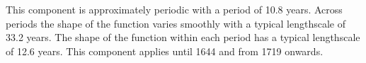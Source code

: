 This component is approximately periodic with a period of 10.8 years.
Across periods the shape of the function varies smoothly with a typical lengthscale of 33.2 years.
The shape of the function within each period has a typical lengthscale of 12.6 years.
This component applies until 1644 and from 1719 onwards.